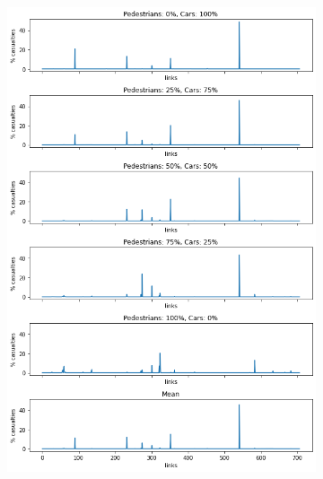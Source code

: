 \begin{figure}
\begin{subfigure}{0.475\textwidth}
        \includegraphics[width=\textwidth]{images/analisi/new_links_casualties.png}
        \caption{}
    \end{subfigure}
    \caption{}
    \label{fig:analisi-comparison-critical-links1}
\end{figure}

